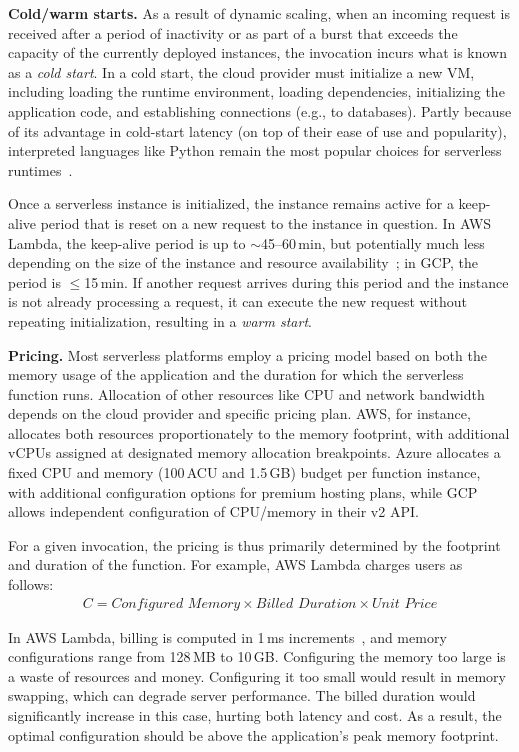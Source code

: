 \documentclass[sigplan,screen]{acmart}
\newcommand{\heading}[1]{\vspace{4pt}\noindent\textbf{#1.}}
\newcounter{example}
\begin{document}
\heading{Cold/warm starts}
As a result of dynamic scaling, when an incoming request is received after a period of inactivity or as part of a burst that exceeds the capacity of the currently deployed instances, the invocation incurs what is known as a \textit{cold start}.
In a cold start, the cloud provider must initialize a new VM, including loading the runtime environment, loading dependencies, initializing the application code, and establishing connections (e.g., to databases).
Partly because of its advantage in cold-start latency (on top of their ease of use and popularity), interpreted languages like Python remain the most popular choices for serverless runtimes~\cite{datadog}.


Once a serverless instance is initialized, the instance remains active for a keep-alive period that is reset on a new request to the instance in question.
In AWS Lambda, the keep-alive period is up to $\sim$45--60\,min, but potentially much less depending on the size of the instance and resource availability~\cite{keepalive-blog}; in GCP, the period is $\leq$15\,min. 
If another request arrives during this period and the instance is not already processing a request, it can execute the new request without repeating initialization, resulting in a \textit{warm start}.


\heading{Pricing}
Most serverless platforms employ a pricing model based on both the memory usage of the application and the duration for which the serverless function runs.
Allocation of other resources like CPU and network bandwidth depends on the cloud provider and specific pricing plan.
AWS, for instance, allocates both resources proportionately to the memory footprint, with additional vCPUs assigned at designated memory allocation breakpoints.
Azure allocates a fixed CPU and memory (100\,ACU and 1.5\,GB) budget per function instance, with additional configuration options for premium hosting plans, while GCP allows independent configuration of CPU/memory in their v2 API.



For a given invocation, the pricing is thus primarily determined by the footprint and duration of the function.
For example, AWS Lambda charges users as follows:
\begin{align}\textit{C}=\textit{Configured Memory} \times \textit{Billed Duration} \times \textit{Unit Price} \label{eq:cost}
\end{align}

\noindent
In AWS Lambda, billing is computed in 1\,ms increments~\cite{lambdaPrice}, and memory configurations range from 128\,MB to 10\,GB.
Configuring the memory too large is a waste of resources and money.
Configuring it too small would result in memory swapping, which can degrade server performance.
The billed duration would significantly increase in this case, hurting both latency and cost.
As a result, the optimal configuration should be above the application's peak memory footprint.
\end{document}
